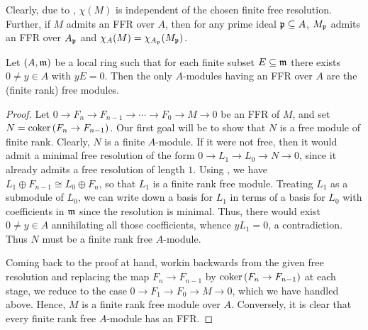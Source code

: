 Clearly, due to , $\chi(M)$ is independent of the chosen finite free resolution. Further, if $M$ admits an FFR over $A$, then for any prime ideal $\mathfrak{p}\subseteq A$, $M_{\mathfrak{p}}$ admits an FFR over $A_{\mathfrak{p}}$ and $\chi_A(M) = \chi_{A_{\mathfrak{p}}}(M_{\mathfrak{p}})$.

\begin{proposition}
    Let $(A,\mathfrak{m})$ be a local ring such that for each finite subset $E\subseteq\mathfrak{m}$ there exists $0\ne y\in A$ with $y E = 0$. Then the only $A$-modules having an FFR over $A$ are the (finite rank) free modules.
\end{proposition}
\begin{proof}
    Let $0\to F_n\to F_{n - 1}\to\cdots\to F_0\to M\to 0$ be an FFR of $M$, and set $N = \operatorname{coker}\left(F_n\to F_{n - 1}\right)$. Our first goal will be to show that $N$ is a free module of finite rank. Clearly, $N$ is a finite $A$-module. If it were not free, then it would admit a minimal free resolution of the form $0\to L_1\to L_0\to N\to 0$, since it already admits a free resolution of length $1$. Using , we have $L_1\oplus F_{n - 1} \cong L_0\oplus F_n$, so that $L_1$ is a finite rank free module. Treating $L_1$ as a submodule of $L_0$, we can write down a basis for $L_1$ in terms of a basis for $L_0$ with coefficients in $\mathfrak{m}$ since the resolution is minimal. Thus, there would exist $0\ne y\in A$ annihilating all those coefficients, whence $y L_1 = 0$, a contradiction. Thus $N$ must be a finite rank free $A$-module.

    Coming back to the proof at hand, workin backwards from the given free resolution and replacing the map $F_n\to F_{n - 1}$ by $\operatorname{coker}\left(F_n\to F_{n - 1}\right)$ at each stage, we reduce to the case $0\to F_1\to F_0\to M\to 0$, which we have handled above. Hence, $M$ is a finite rank free module over $A$. Conversely, it is clear that every finite rank free $A$-module has an FFR.
\end{proof}

